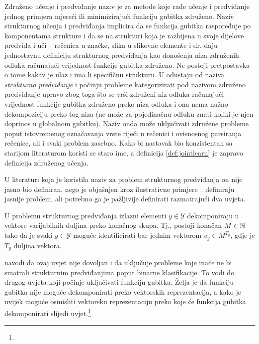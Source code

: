 Združeno učenje i predviđanje  naziv je za
metode koje rade učenje i predviđanje jednog primjera mjereći ili minimizirajući
funkciju gubitka združeno. Naziv strukturnog učenja i predviđanja
 implicira da se funkcija gubitka
raspoređuje po komponentama strukture i da se na strukturi koja je razbijena u
svoje dijelove predviđa i uči -- rečenica u značke, slika u slikovne elemente
i dr. \citet{daume14lts} daju jednostavnu definiciju strukturnog predviđanja kao
donošenja niza združenih odluka računajući vrijednost funkcije gubitka združeno.
Ne postoji pretpostavka o tome kakav je ulaz i ima li specifičnu strukturu. U
\citep{daume14lts, daume15naacltalk} odustaju od naziva \emph{strukturno
predviđanje} i počinju probleme kategorizirati pod nazivom združeno predviđanje
upravo zbog toga što se vrši združeni niz odluka računajući vrijednost
funkcije gubitka združeno preko niza odluka i ona nema nužno dekompoziciju preko
tog niza (ne može za pojedinačnu odluku znati koliki je njen doprinos u
globalnom gubitku). Naziv onda može uključivati združene probleme poput
istovremenog označavanja vrste riječi u rečenici i ovisnosnog parsiranja
rečenice, ali i svaki problem zasebno. Kako bi nastavak bio konzistentan sa
starijom literaturom koristi se staro ime, a definicija \ref{def:jointlearn} je
zapravo definicija združenog učenja.

U literaturi koja je koristila naziv za problem strukturnog predviđanja on
nije jasno bio definiran, nego je objašnjen kroz ilustrativne
primjere~\citep{mccallum2000maximum, punyakanok2001use, lafferty2001conditional,
collins2002discriminative, taskar2003maximum, mcallester2004case,
tsochantaridis2005large}. \citet{daume09searn} definiraju jasnije problem, ali
potrebno ga je pažljivije definirati razmatrajući dva uvjeta.

\begin{condition} \label{uvjet1}

  U problemu strukturnog predviđanja izlazni elementi $y \in \mathcal{Y}$
  dekomponiraju u vektore varijabilnih duljina preko konačnog skupa. Tj.,
  postoji konačan $M \in \mathbb{N}$ tako da je svaki $y \in \mathcal{Y}$ moguće
  identificirati bar jednim vektorom $v_y \in M^{T_y}$, gdje je $T_y$ duljina
  vektora.

\end{condition}

\noindent
\citeauthor{daume06thesis} navodi da ovaj uvjet nije dovoljan i da uključuje
probleme koje inače ne bi smatrali strukturnim predviđanjima poput binarne
klasifikacije. To vodi do drugog uvjeta koji počinje uključivati funkciju
gubitka. Želja je da funkciju gubitka nije moguće dekomponirati preko vektorskih
reprezentacija, a kako je uvijek moguće osmisliti vektorsku reprezentaciju preko
koje će funkcija gubitka dekomponirati slijedi uvjet.\footnote{}

